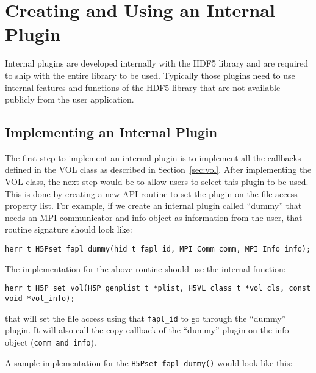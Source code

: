 \section{Creating and Using an Internal Plugin}
Internal plugins are developed internally with the HDF5 library and
are required to ship with the entire library to be used. Typically
those plugins need to use internal features and functions of the HDF5
library that are not available publicly from the user application.

\subsection{Implementing an Internal Plugin}
The first step to implement an internal plugin is to implement all the callbacks defined in the VOL class as described in Section~\ref{sec:vol}. After implementing the VOL class, the next step would be to allow users to select
this plugin to be used. This is done by creating a new API routine to
set the plugin on the file access property list. For example, if we
create an internal plugin called ``dummy'' that needs an MPI
communicator and info object as information from the user, that
routine signature should look like:

\begin{lstlisting}
herr_t H5Pset_fapl_dummy(hid_t fapl_id, MPI_Comm comm, MPI_Info info);
\end{lstlisting}

The implementation for the above routine should use the internal
function:
\begin{lstlisting}
herr_t H5P_set_vol(H5P_genplist_t *plist, H5VL_class_t *vol_cls, const
void *vol_info);
\end{lstlisting}
that will set the file access using that {\tt fapl\_id} to go through
the ``dummy'' plugin. It will also call the copy callback of the
``dummy'' plugin on the info object ({\tt comm and info}).

A sample implementation for the {\tt H5Pset\_fapl\_dummy()} would look like this:

